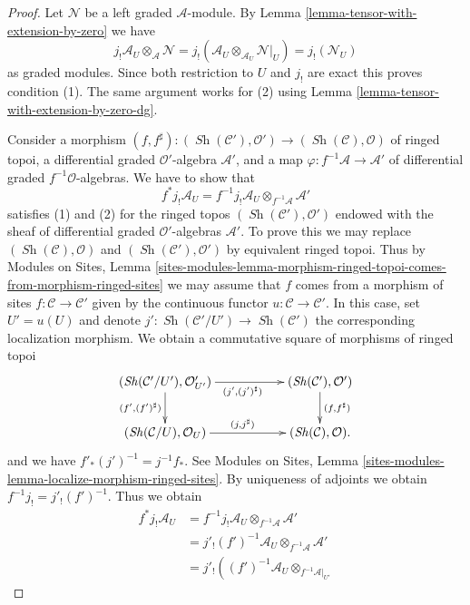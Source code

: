 \documentclass{stacks-project}
\theoremstyle{plain}
\theoremstyle{definition}
\theoremstyle{remark}
\numberwithin{equation}{subsection}
\def\Sh{\mathop{\mathit{Sh}}\nolimits}
\begin{document}
\begin{proof}
Let $\mathcal{N}$ be a left graded $\mathcal{A}$-module.
By Lemma \ref{lemma-tensor-with-extension-by-zero} we have
$$
j_!\mathcal{A}_U \otimes_\mathcal{A} \mathcal{N} =
j_!(\mathcal{A}_U \otimes_{\mathcal{A}_U} \mathcal{N}|_U) =
j_!(\mathcal{N}_U)
$$
as graded modules.
Since both restriction to $U$ and $j_!$ are exact this proves
condition (1). The same argument works for (2) using
Lemma \ref{lemma-tensor-with-extension-by-zero-dg}.

\medskip\noindent
Consider a morphism $(f, f^\sharp) : (\Sh(\mathcal{C}'), \mathcal{O}')
\to (\Sh(\mathcal{C}), \mathcal{O})$
of ringed topoi, a differential graded $\mathcal{O}'$-algebra
$\mathcal{A}'$, and a map $\varphi : f^{-1}\mathcal{A} \to \mathcal{A}'$
of differential graded $f^{-1}\mathcal{O}$-algebras.
We have to show that
$$
f^*j_!\mathcal{A}_U =
f^{-1}j_!\mathcal{A}_U \otimes_{f^{-1}\mathcal{A}} \mathcal{A}'
$$
satisfies (1) and (2) for the ringed topos
$(\Sh(\mathcal{C}'), \mathcal{O}')$ endowed with the
sheaf of differential graded $\mathcal{O}'$-algebras
$\mathcal{A}'$. To prove this we may replace
$(\Sh(\mathcal{C}), \mathcal{O})$ and
$(\Sh(\mathcal{C}'), \mathcal{O}')$ by equivalent ringed topoi.
Thus by
Modules on Sites, Lemma
\ref{sites-modules-lemma-morphism-ringed-topoi-comes-from-morphism-ringed-sites}
we may assume that $f$ comes from a morphism of sites
$f : \mathcal{C} \to \mathcal{C}'$ given by the continuous
functor $u : \mathcal{C} \to \mathcal{C}'$.
In this case, set $U' = u(U)$ and denote
$j' : \Sh(\mathcal{C}'/U') \to \Sh(\mathcal{C}')$ the
corresponding localization morphism.
We obtain a commutative square of morphisms of ringed topoi
$$
\xymatrix{
(\Sh(\mathcal{C}'/U'), \mathcal{O}'_{U'})
\ar[rr]_{(j', (j')^\sharp)} \ar[d]_{(f', (f')^\sharp)} & &
(\Sh(\mathcal{C}'), \mathcal{O}')
\ar[d]^{(f, f^\sharp)} \\
(\Sh(\mathcal{C}/U), \mathcal{O}_U)
\ar[rr]^{(j, j^\sharp)} & &
(\Sh(\mathcal{C}), \mathcal{O}).
}
$$
and we have $f'_*(j')^{-1} = j^{-1}f_*$. See
Modules on Sites, Lemma
\ref{sites-modules-lemma-localize-morphism-ringed-sites}.
By uniqueness of adjoints we obtain
$f^{-1}j_! = j'_!(f')^{-1}$. Thus we obtain
\begin{align*}
f^*j_!\mathcal{A}_U
& =
f^{-1}j_!\mathcal{A}_U \otimes_{f^{-1}\mathcal{A}} \mathcal{A}' \\
& =
j'_!(f')^{-1}\mathcal{A}_U \otimes_{f^{-1}\mathcal{A}} \mathcal{A}' \\
& =
j'_!\left(
(f')^{-1}\mathcal{A}_U \otimes_{f^{-1}\mathcal{A}|_{U'}}

\end{align*}
\end{proof}
\end{document}
